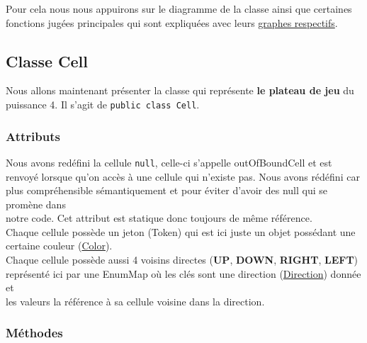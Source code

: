 \documentclass[11pt]{article}
\begin{document}
Pour cela nous nous appuirons sur le diagramme de la classe ainsi que certaines\\
fonctions jugées principales qui sont expliquées avec leurs \hyperref[org58a15d4]{graphes respectifs}.\\

\subsection{Classe Cell\label{orgc81d8e8}}
\label{sec:org7ab91b8}

Nous allons maintenant présenter la classe qui représente \textbf{le plateau de jeu} du\\
puissance 4. Il s'agit de \texttt{public class Cell}.\\

\subsubsection{Attributs}
\label{sec:orgd992ba5}

Nous avons redéfini la cellule \texttt{null}, celle-ci s'appelle outOfBoundCell et est\\
renvoyé lorsque qu'on accès à une cellule qui n'existe pas. Nous avons rédéfini car\\
plus compréhensible sémantiquement et pour éviter d'avoir des null qui se promène dans\\
notre code. Cet attribut est statique donc toujours de même référence.\\

Chaque cellule possède un jeton (Token) qui est ici juste un objet possédant une\\
certaine couleur (\hyperref[org4fc9396]{Color}).\\

Chaque cellule possède aussi 4 voisins directes (\textbf{UP}, \textbf{DOWN}, \textbf{RIGHT}, \textbf{LEFT})\\
représenté ici par une EnumMap où les clés sont une direction (\hyperref[org010dbac]{Direction}) donnée et\\
les valeurs la référence à sa cellule voisine dans la direction.\\

\subsubsection{Méthodes}
\label{sec:org38f0060}
\end{document}
